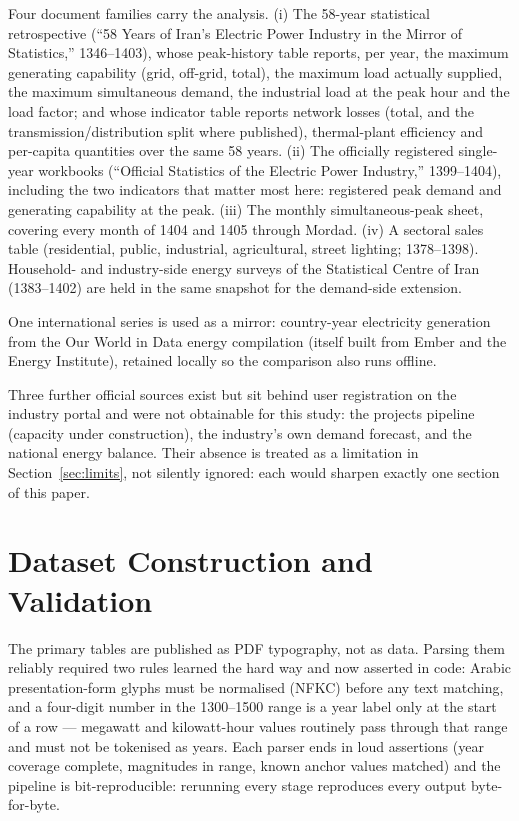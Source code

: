 \documentclass[conference]{IEEEtran}
\begin{document}
Four document families carry the analysis. (i) The 58-year statistical retrospective (``58 Years of Iran's Electric Power Industry in the Mirror of Statistics,'' 1346--1403), whose peak-history table reports, per year, the maximum generating capability (grid, off-grid, total), the maximum load actually supplied, the maximum simultaneous demand, the industrial load at the peak hour and the load factor; and whose indicator table reports network losses (total, and the transmission/distribution split where published), thermal-plant efficiency and per-capita quantities over the same 58 years. (ii) The officially registered single-year workbooks (``Official Statistics of the Electric Power Industry,'' 1399--1404), including the two indicators that matter most here: registered peak demand and generating capability at the peak. (iii) The monthly simultaneous-peak sheet, covering every month of 1404 and 1405 through Mordad. (iv) A sectoral sales table (residential, public, industrial, agricultural, street lighting; 1378--1398). Household- and industry-side energy surveys of the Statistical Centre of Iran (1383--1402) are held in the same snapshot for the demand-side extension.

One international series is used as a mirror: country-year electricity generation from the Our World in Data energy compilation (itself built from Ember and the Energy Institute), retained locally so the comparison also runs offline.

Three further official sources exist but sit behind user registration on the industry portal and were not obtainable for this study: the projects pipeline (capacity under construction), the industry's own demand forecast, and the national energy balance. Their absence is treated as a limitation in Section~\ref{sec:limits}, not silently ignored: each would sharpen exactly one section of this paper.

\section{Dataset Construction and Validation}
\label{sec:construction}
The primary tables are published as PDF typography, not as data. Parsing them reliably required two rules learned the hard way and now asserted in code: Arabic presentation-form glyphs must be normalised (NFKC) before any text matching, and a four-digit number in the 1300--1500 range is a year label only at the start of a row --- megawatt and kilowatt-hour values routinely pass through that range and must not be tokenised as years. Each parser ends in loud assertions (year coverage complete, magnitudes in range, known anchor values matched) and the pipeline is bit-reproducible: rerunning every stage reproduces every output byte-for-byte.
\end{document}
